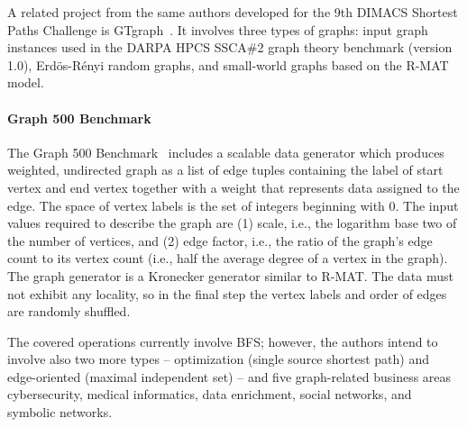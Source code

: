 A related project from the same authors developed for the 9th DIMACS Shortest Paths Challenge is GTgraph~\cite{GTgraph}. It involves three types of graphs: input graph instances used in the DARPA HPCS SSCA\#2 graph theory benchmark (version 1.0), Erd\"{o}s-R\'{e}nyi random graphs, and small-world graphs based on the R-MAT model.


\paragraph{Graph 500 Benchmark} The Graph 500 Benchmark~\cite{Graph500} includes a scalable data generator which produces weighted, undirected graph as a list of edge tuples containing the label of start vertex and end vertex together with a weight that represents data assigned to the edge. The space of vertex  labels is the set of integers beginning with 0. The input values required to describe the graph are (1) scale, i.e., the logarithm base two of the number of vertices, and (2) edge factor, i.e., the ratio of the graph's edge count to its vertex count (i.e., half the average degree of a vertex in the graph). The graph generator is a Kronecker generator similar to R-MAT. The data must not exhibit any locality, so in the final step the vertex labels and order of edges are randomly shuffled.

The covered operations currently involve BFS; however, the authors intend to involve also two more types -- optimization (single source shortest path) and edge-oriented (maximal independent set) -- and five graph-related business areas cybersecurity, medical informatics, data enrichment, social networks, and symbolic networks.





